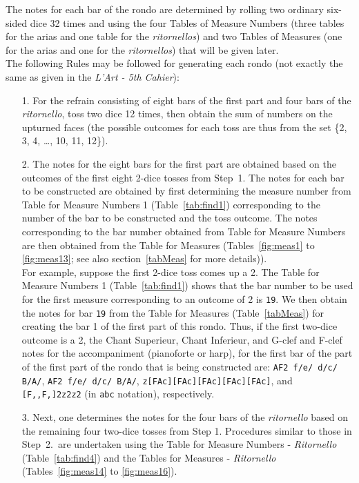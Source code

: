 \documentclass[a4paper,x11names,svgnames,10pt]{article}
\begin{document}
{The notes for each bar of the rondo are determined by rolling two ordinary six-sided dice 32 times and using the four Tables of Measure Numbers (three tables for the arias and one table for the {\it ritornellos}) and two Tables of Measures (one for the arias and one for the {\it ritornellos}) that will be  given later.\\

The following Rules may be followed for generating each rondo (not exactly the same as given in the {\em L'Art - 5th Cahier}):

\begin{enumerate}
	\item [1.\label{step1}] For the refrain consisting of eight bars of the first part and four bars of the {\it ritornello}, toss two dice 12 times, then obtain the sum of numbers on the upturned faces (the possible outcomes for each toss are thus from the set \{2, 3, 4, \ldots, 10, 11, 12\}). 
	
	\item [2.\label{step2}] The notes for the eight bars for the first part are obtained based on the outcomes of the first eight 2-dice tosses from Step~1.  The notes for each bar to be constructed are obtained by first determining the measure number from Table for Measure Numbers 1 (Table~\ref{tab:find1}) corresponding to the number of the bar to be constructed and the toss outcome.  The notes corresponding to the bar number  obtained from Table for Measure Numbers are then obtained from the Table for Measures (Tables~\ref{fig:meas1} to \ref{fig:meas13}; see also section~\ref{tabMeas} for more details)).\\
	For example, suppose the first 2-dice toss comes up a 2.  The Table for Measure Numbers 1 (Table~\ref{tab:find1}) shows that the bar number to be used for the first measure corresponding to an outcome of 2 is {\tt 19}.  We then obtain the notes for bar {\tt 19} from the Table for Measures (Table~\ref{tabMeas}) for creating the bar 1 of the first part of this rondo.  Thus, if the first two-dice outcome is a 2, the Chant Superieur, Chant Inferieur, and G-clef and F-clef notes for the accompaniment (pianoforte or harp), for the first bar of the part of the first part of the rondo that is being constructed are: {\tt AF2 f/e/ d/c/ B/A/}, {\tt AF2 f/e/ d/c/ B/A/}, {\tt z[FAc][FAc][FAc][FAc][FAc]}, and {\tt [F,,F,]2z2z2} (in {\tt abc} notation), respectively. 

	\item[3.\label{step3}] Next, one determines the notes for the  four bars of the {\it ritornello} based on the  remaining four two-dice tosses from Step 1. Procedures similar to those in Step~2.\ are undertaken using the Table for Measure Numbers - {\it Ritornello} (Table~\ref{tab:find4}) and the Tables for Measures - {\it Ritornello} (Tables~\ref{fig:meas14} to \ref{fig:meas16}).
	

\end{enumerate}}
\end{document}
